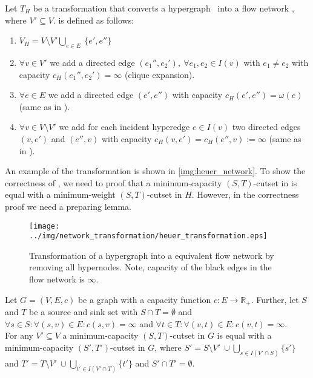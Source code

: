 
\begin{definition}
Let $T_H$ be a transformation that converts a hypergraph \HypergraphDef~into 
a flow network , where $V' \subseteq V$.  is defined as follows:
\begin{enumerate}
\item $V_H = V\setminus V' \bigcup\limits_{e \in E}\ \{e', e''\}$
\item $\forall v \in V'$ we add a directed edge $(e_1'', e_2'),\ \forall e_1, e_2 \in I(v)$ 
      with $e_1 \neq e_2$ with capacity $c_H(e_1'', e_2') = \infty$ (clique expansion).
\item $\forall e \in E$ we add a directed edge $(e',e'')$
      with capacity $c_H(e',e'') = \omega(e)$ (same as in ).
\item $\forall v \in V\setminus V'$ we add for each incident hyperedge $e \in I(v)$ two directed
      edges $(v,e')$ and $(e'',v)$ with capacity 
      $c_H(v,e') = c_H(e'',v) := \infty$ (same as in ).
\end{enumerate} 
\end{definition}

An example of the transformation is shown in \autoref{img:heuer_network}. To show
the correctness of , we need to proof that a minimum-capacity $(S,T)$-cutset
in  is equal with a minimum-weight $(S,T)$-cutset in $H$. However,
in the correctness proof we need a preparing lemma.

\begin{figure}
\centering
\texttt{[image: ../img/network\_transformation/heuer\_transformation.eps]}
\caption{Transformation of a hypergraph into a equivalent flow network by removing
         all hypernodes. Note, capacity of the black edges in the flow network is $\infty$.}
\label{img:heuer_network}
\end{figure}

\begin{lemma}
\label{lemma:lemma1}
Let $G = (V,E,c)$ be a graph with a capacity function $c: E \rightarrow \mathbb{R}_+$. Further, 
let $S$ and $T$ be a source and sink set with $S \cap T = \emptyset$ and
$\forall s \in S:\forall (s,v) \in E: c(s,v) = \infty$ and $\forall t 
\in T:\forall (v,t) \in E: c(v,t) = \infty$. \\
For any $V' \subseteq V$ a minimum-capacity $(S,T)$-cutset in $G$ is equal with a minimum-capacity
$(S',T')$-cutset in $G$, where $S' = S\setminus V'\ \cup \bigcup\limits_{s \in I(V' \cap S)} \{s'\}$ and 
$T' = T\setminus V'\ \cup \bigcup\limits_{t' \in I(V' \cap T)} \{t'\}$ and $S' \cap T' = \emptyset$.
\end{lemma}

